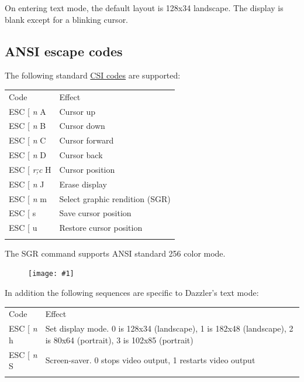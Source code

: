 \documentclass{article}
\newcommand{\eg}[1]{
\begin{framed}

\end{framed}
}
\newcommand{\heavyline}{\specialrule{1pt}{1pt}{1pt}}
\newcommand{\pngw}[2]{
\begin{figure}[H]
\begin{center}
\texttt{[image: \#1]}
\end{center}
\end{figure}
}
\newcommand{\gap}{\vspace{10pt}}
\begin{document}
\newpage
\eg{textmode}

On entering text mode, the default layout is 128x34 landscape. The display is blank except for a blinking cursor.

\subsection{ANSI escape codes}

The following standard
\href{https://en.wikipedia.org/wiki/ANSI_escape_code\#CSI_sequences}{CSI codes}
are supported:

\gap\noindent
\begin{tabularx}{\linewidth}{lX}
\heavyline
Code & Effect \\ \heavyline

ESC {[} \emph{n} A & Cursor up \\

ESC {[} \emph{n} B & Cursor down \\

ESC {[} \emph{n} C & Cursor forward \\

ESC {[} \emph{n} D & Cursor back \\

ESC {[} \emph{r;c} H & Cursor position \\

ESC {[} \emph{n} J & Erase display \\

ESC {[} \emph{n} m & Select graphic rendition (SGR)\\

ESC {[} s & Save cursor position \\

ESC {[} u & Restore cursor position \\ \heavyline
\end{tabularx}
\gap

The SGR command supports ANSI standard 256 color mode.

\pngw{img/gameduino-3x-dazzler/textmode256}{1.0}

In addition the following sequences are specific to Dazzler's text mode:

\gap
\noindent
\begin{tabularx}{\linewidth}{lX}
\heavyline
Code & Effect \\ \heavyline

ESC {[} \emph{n} h & 
Set display mode.  0 is 128x34 (landscape), 1 is 182x48 (landscape), 2 is 80x64 (portrait), 3 is 102x85 (portrait)
\\

ESC {[} \emph{n} S & Screen-saver.  0 stops video output, 1 restarts video output
\\ \heavyline
\end{tabularx}
\gap
\end{document}
